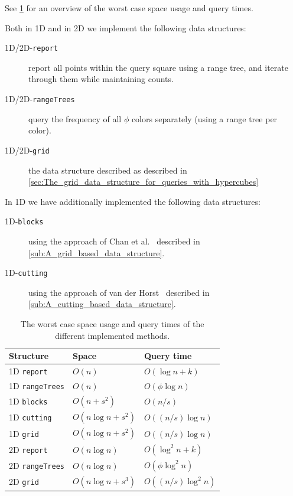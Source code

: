 \documentclass[twoside,leqno,twocolumn]{article}
\newcommand{\etal}{et al.\xspace}
\begin{document}
See \cref{tab:theoreticalOverview} for an overview of the worst case space usage and query times.

Both in 1D and in 2D we implement the following data structures:

\newcommand{\report}{\texttt{report}\xspace}
\newcommand{\rangeTrees}{\texttt{rangeTrees}\xspace}
\newcommand{\grid}{\texttt{grid}\xspace}
\begin{description}
    \item[1D/2D-\report] report all points within the query square using a range tree, and iterate through them while maintaining counts.
    \item[1D/2D-\rangeTrees] query the frequency of all $\phi$ colors separately (using a range tree per color).
    \item[1D/2D-\grid] the data structure described as described in \cref{sec:The_grid_data_structure_for_queries_with_hypercubes}
\end{description}

\newcommand{\blocks}{\texttt{blocks}\xspace}
\newcommand{\cutting}{\texttt{cutting}\xspace}
In 1D we have additionally implemented the following data structures:
\begin{description}
  \item[1D-\blocks] using the approach of Chan \etal~\cite{chan2014modeQuery} described in \cref{sub:A_grid_based_data_structure}.
  \item[1D-\cutting] using the approach of van der Horst~\cite{chromatic_knn2025} described in \cref{sub:A_cutting_based_data_structure}.
\end{description}


\begin{table}
  \centering
\begin{tabular}{lll}
\toprule
Structure  & Space               & Query time       \\
\midrule
1D \report     & $O(n)$              & $O(\log n + k)$  \\
1D \rangeTrees & $O(n)$              & $O(\phi \log n)$ \\
1D \blocks     & $O(n + s^2)$        & $O(n/s)$         \\
1D \cutting    & $O(n \log n + s^2)$ & $O((n/s) \log n)$  \\
1D \grid       & $O(n \log n + s^2)$ & $O((n/s) \log n)$  \\
2D \report     & $O(n \log n)$       & $O(\log^2 n + k)$  \\
2D \rangeTrees & $O(n \log n)$       & $O(\phi \log^2 n)$ \\
2D \grid       & $O(n \log n + s^3)$ & $O((n/s) \log^2 n)$  \\
\bottomrule
\end{tabular}
\caption{The worst case space usage and query times of the different
  implemented methods.}
\label{tab:theoreticalOverview}
\end{table}
\end{document}
